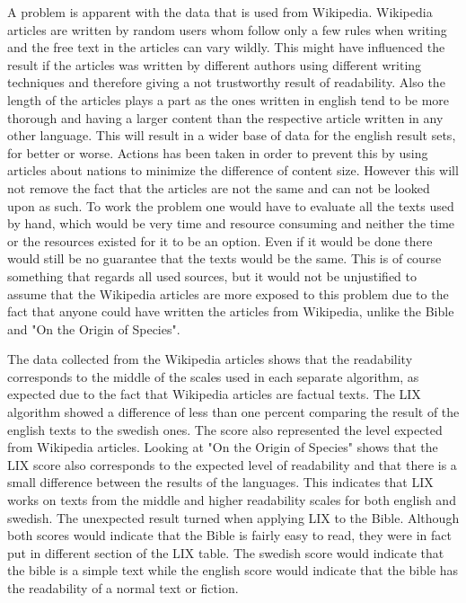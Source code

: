 \documentclass[a4paper]{article}
\begin{document}
A problem is apparent with the data that is used from Wikipedia. Wikipedia articles are written by random users whom follow only a few rules when writing and the free text in the articles can vary wildly. This might have influenced the result if the articles was written by different authors using different writing techniques and therefore giving a not trustworthy result of readability. Also the length of the articles plays a part as the ones written in english tend to be more thorough and having a larger content than the respective article written in any other language. This will result in a wider base of data for the english result sets, for better or worse. Actions has been taken in order to prevent this by using articles about nations to minimize the difference of content size. However this will not remove the fact that the articles are not the same and can not be looked upon as such. To work the problem one would have to evaluate all the texts used by hand, which would be very time and resource consuming and neither the time or the resources existed for it to be an option. Even if it would be done there would still be no guarantee that the texts would be the same. This is of course something that regards all used sources, but it would not be unjustified to assume that the Wikipedia articles are more exposed to this problem due to the fact that anyone could have written the articles from Wikipedia, unlike the Bible and "On the Origin of Species".

The data collected from the Wikipedia articles shows that the readability corresponds to the middle of the scales used in each separate algorithm, as expected due to the fact that Wikipedia articles are factual texts. The LIX algorithm showed a difference of less than one percent comparing the result of the english texts to the swedish ones. The score also represented the level expected from Wikipedia articles. Looking at "On the Origin of Species" shows that the LIX score also corresponds to the expected level of readability and that there is a small difference between the results of the languages. This indicates that LIX works on texts from the middle and higher readability scales for both english and swedish. The unexpected result turned when applying LIX to the Bible. Although both scores would indicate that the Bible is fairly easy to read, they were in fact put in different section of the LIX table. The swedish score would indicate that the bible is a simple text while the english score would indicate that the bible has the readability of a normal text or fiction.
\end{document}
